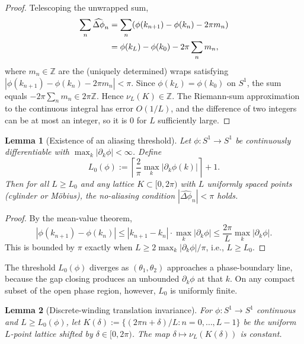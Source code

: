 \documentclass[aps,pra,reprint,amsmath,amssymb,superscriptaddress,nofootinbib,longbibliography]{revtex4-2}
\newcommand{\Z}{\mathbb{Z}}
\newtheorem{lemma}{Lemma}
\begin{document}
\begin{proof}
Telescoping the unwrapped sum,
\begin{align}
\sum_n \widehat{\Delta\phi}_n &= \sum_n (\phi(k_{n+1}) - \phi(k_n) - 2\pi m_n) \notag\\
&= \phi(k_L) - \phi(k_0) - 2\pi \sum_n m_n,
\end{align}
where $m_n \in \Z$ are the (uniquely determined) wraps satisfying $|\phi(k_{n+1}) - \phi(k_n) - 2\pi m_n| < \pi$. Since $\phi(k_L) = \phi(k_0)$ on $S^1$, the sum equals $-2\pi \sum_n m_n \in 2\pi\Z$. Hence $\nu_L(K) \in \Z$. The Riemann-sum approximation to the continuous integral has error $O(1/L)$, and the difference of two integers can be at most an integer, so it is $0$ for $L$ sufficiently large.
\end{proof}

\begin{lemma}[Existence of an aliasing threshold]
\label{lem:threshold}
Let $\phi: S^1 \to S^1$ be continuously differentiable with $\max_k |\partial_k \phi| < \infty$. Define
\begin{equation}
L_0(\phi) := \left\lceil \frac{2}{\pi} \max_{k} |\partial_k \phi(k)| \right\rceil + 1.
\end{equation}
Then for all $L \geq L_0$ and any lattice $K \subset [0, 2\pi)$ with $L$ uniformly spaced points (cylinder or M\"obius), the no-aliasing condition $|\widehat{\Delta\phi}_n| < \pi$ holds.
\end{lemma}

\begin{proof}
By the mean-value theorem,
\begin{equation}
|\phi(k_{n+1}) - \phi(k_n)| \leq |k_{n+1} - k_n| \cdot \max_k|\partial_k\phi| \leq \frac{2\pi}{L} \max_k|\partial_k\phi|.
\end{equation}
This is bounded by $\pi$ exactly when $L \geq 2 \max_k|\partial_k\phi|/\pi$, i.e., $L \geq L_0$.
\end{proof}

The threshold $L_0(\phi)$ diverges as $(\theta_1, \theta_2)$ approaches a phase-boundary line, because the gap closing produces an unbounded $\partial_k \phi$ at that $k$. On any compact subset of the open phase region, however, $L_0$ is uniformly finite.

\begin{lemma}[Discrete-winding translation invariance]
\label{lem:translation}
For $\phi: S^1 \to S^1$ continuous and $L \geq L_0(\phi)$, let $K(\delta) := \{(2\pi n + \delta)/L : n = 0, \dots, L-1\}$ be the uniform $L$-point lattice shifted by $\delta \in [0, 2\pi)$. The map $\delta \mapsto \nu_L(K(\delta))$ is constant.
\end{lemma}
\end{document}
